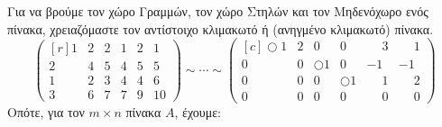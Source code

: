 \documentclass[a4paper,table]{report}
\begin{document}
Για να βρούμε τον χώρο Γραμμών, τον χώρο Στηλών και τον Μηδενόχωρο ενός πίνακα, 
χρειαζόμαστε τον αντίστοιχο κλιμακωτό ή (ανηγμένο κλιμακωτό) πίνακα.
\[
  \begin{pmatrix*}[r]
    1 & 2 & 2 & 1 & 2 & 1 \\
    2 & 4 & 5 & 4 & 5 & 5 \\
    1 & 2 & 3 & 4 & 4 & 6 \\
    3 & 6 & 7 & 7 & 9 & 10 
  \end{pmatrix*} \sim \cdots \sim 
  \begin{pmatrix*}[c]
    \Circle{1} & 2 & 0 & 0 & \phantom{-}3 & \phantom{-}1 \\
    0 & 0 & \Circle{1} & 0 & -1 & -1 \\
    0 & 0 & 0 & \Circle{1} & \phantom{-}1 & \phantom{-}2 \\
    0 & 0 & 0 & 0 & \phantom{-}0 & \phantom{-}0 
  \end{pmatrix*}
\]
Οπότε, για τον $ m \times n $ πίνακα $A$, έχουμε:
\end{document}
